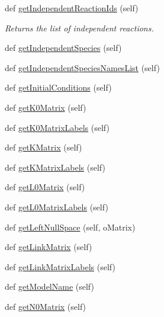 \begin{DoxyCompactItemize}
def \hyperlink{classstructural_1_1_lib_structural_a8743474315108b043a9131dbecce5db2}{get\+Independent\+Reaction\+Ids} (self)
\begin{DoxyCompactList}\small\item\em Returns the list of independent reactions. \end{DoxyCompactList}\item 
def \hyperlink{classstructural_1_1_lib_structural_ae3e43f16e28f43c137f9aaee461daae1}{get\+Independent\+Species} (self)
\item 
def \hyperlink{classstructural_1_1_lib_structural_acd95445914fa0d9132fd52e301ad2735}{get\+Independent\+Species\+Names\+List} (self)
\item 
def \hyperlink{classstructural_1_1_lib_structural_a4ce1f680d90baeb502b27f41e74b67c5}{get\+Initial\+Conditions} (self)
\item 
def \hyperlink{classstructural_1_1_lib_structural_a966f9e76a36cf1d083a13cbfbc7787b5}{get\+K0\+Matrix} (self)
\item 
def \hyperlink{classstructural_1_1_lib_structural_ab5946f3eaff2a99d58ca4310a42eb30d}{get\+K0\+Matrix\+Labels} (self)
\item 
def \hyperlink{classstructural_1_1_lib_structural_a7e04387dd286ecea63a2f17f990aabcc}{get\+K\+Matrix} (self)
\item 
def \hyperlink{classstructural_1_1_lib_structural_a0bcdd5febcac7c1fa2882c307addcdfe}{get\+K\+Matrix\+Labels} (self)
\item 
def \hyperlink{classstructural_1_1_lib_structural_ab082b1fd50b88795d24eb4cbd936c402}{get\+L0\+Matrix} (self)
\item 
def \hyperlink{classstructural_1_1_lib_structural_a4f5b7214fdc9441e440987511fda94d8}{get\+L0\+Matrix\+Labels} (self)
\item 
def \hyperlink{classstructural_1_1_lib_structural_a499f7f44b71fd51b3806b937a00d0cbe}{get\+Left\+Null\+Space} (self, o\+Matrix)
\item 
def \hyperlink{classstructural_1_1_lib_structural_ae595a199202c3c42c22ec125a9b6f0d7}{get\+Link\+Matrix} (self)
\item 
def \hyperlink{classstructural_1_1_lib_structural_a1d748449d47512e31ed1300abb3117e2}{get\+Link\+Matrix\+Labels} (self)
\item 
def \hyperlink{classstructural_1_1_lib_structural_ab8a8f002508e4617651e3acf99c9be73}{get\+Model\+Name} (self)
\item 
def \hyperlink{classstructural_1_1_lib_structural_a2b4ae47db717497d89798d23c37d649e}{get\+N0\+Matrix} (self)

\end{DoxyCompactItemize}
